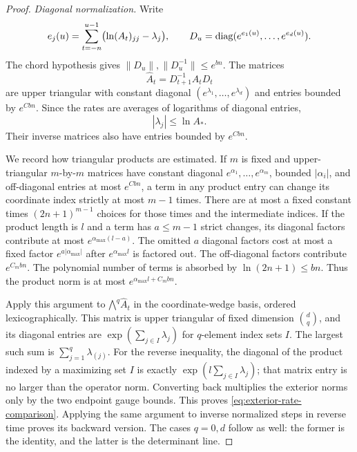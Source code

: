 \begin{proof}
\emph{Diagonal normalization.}
Write
\[
 e_j(u)=\sum_{t=-n}^{u-1}\bigl(\ln(A_t)_{jj}-\lambda_j\bigr),
 \qquad
 D_u=\operatorname{diag}(e^{e_1(u)},\ldots,e^{e_d(u)}).
\]
The chord hypothesis gives
$\|D_u\|,\|D_u^{-1}\|\leq e^{bn}$.
The matrices
\[
 \widehat A_t=D_{t+1}^{-1}A_tD_t
\]
are upper triangular with constant diagonal
$(e^{\lambda_1},\ldots,e^{\lambda_d})$ and entries bounded by
$e^{Cbn}$.  Since the rates are averages of logarithms of diagonal
entries,
\begin{equation}\label{eq:bounded-rates}
 |\lambda_j|\leq\ln A_*.
\end{equation}
Their inverse matrices also have entries bounded by $e^{Cbn}$.

We record how triangular products are estimated.  If $m$ is fixed and
upper-triangular $m$-by-$m$ matrices have constant diagonal
$e^{\alpha_1},\ldots,e^{\alpha_m}$, bounded $|\alpha_i|$, and
off-diagonal entries at most $e^{Cbn}$, a term in any product entry
can change its coordinate index strictly at most $m-1$ times.
There are at most a fixed constant times $(2n+1)^{m-1}$ choices
for those times and the intermediate indices.
If the product length is $l$ and a term has $a\leq m-1$ strict
changes, its diagonal factors contribute at most
$e^{\alpha_{\max}(l-a)}$.
The omitted $a$ diagonal factors cost at most a fixed factor
$e^{a|\alpha_{\max}|}$ after $e^{\alpha_{\max}l}$ is factored out.
The off-diagonal factors contribute $e^{C_mbn}$.
The polynomial number of terms is absorbed by
$\ln(2n+1)\leq bn$.  Thus the product norm is at most
$e^{\alpha_{\max}l+C_mbn}$.

Apply this argument to $\mathord{\bigwedge}^q\widehat A_t$ in the
coordinate-wedge basis, ordered lexicographically.
This matrix is upper triangular of fixed dimension $\binom dq$,
and its diagonal entries are
$\exp(\sum_{j\in I}\lambda_j)$ for $q$-element index sets $I$.
The largest such sum is $\sum_{j=1}^q\lambda_{(j)}$.
For the reverse inequality, the diagonal of the product indexed by
a maximizing set $I$ is exactly
$\exp(l\sum_{j\in I}\lambda_j)$; that matrix entry is no larger
than the operator norm.  Converting back multiplies the exterior
norms only by the two endpoint gauge bounds.
This proves \eqref{eq:exterior-rate-comparison}.
Applying the same argument to inverse normalized steps in reverse
time proves its backward version.  The cases $q=0,d$ follow as well:
the former is the identity, and the latter is the determinant line.


\end{proof}
